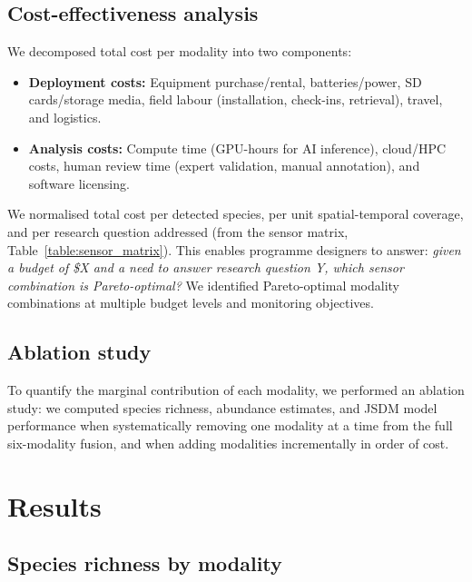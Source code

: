 \documentclass[12pt]{article}
\begin{document}
{%

\subsection{Cost-effectiveness analysis}

We decomposed total cost per modality into two components:

\begin{itemize}
    \item \textbf{Deployment costs:} Equipment purchase/rental, batteries/power, SD cards/storage media, field labour (installation, check-ins, retrieval), travel, and logistics.
    \item \textbf{Analysis costs:} Compute time (GPU-hours for AI inference), cloud/HPC costs, human review time (expert validation, manual annotation), and software licensing.
\end{itemize}

We normalised total cost per detected species, per unit spatial-temporal coverage, and per research question addressed (from the sensor matrix, Table~\ref{table:sensor_matrix}). This enables programme designers to answer: \textit{given a budget of \$X and a need to answer research question Y, which sensor combination is Pareto-optimal?} We identified Pareto-optimal modality combinations at multiple budget levels and monitoring objectives.

\subsection{Ablation study}

To quantify the marginal contribution of each modality, we performed an ablation study: we computed species richness, abundance estimates, and JSDM model performance when systematically removing one modality at a time from the full six-modality fusion, and when adding modalities incrementally in order of cost.



\section{Results}

\subsection{Species richness by modality}

}
\end{document}

